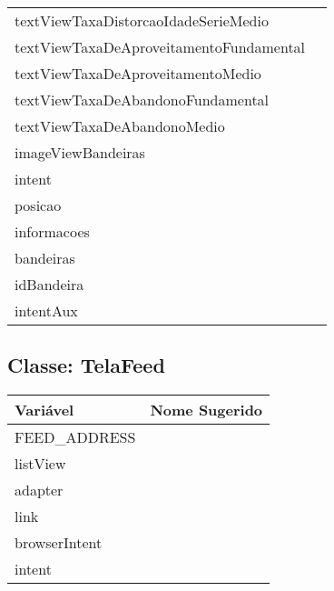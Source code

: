 \documentclass[12pt]{article}
\begin{document}
\begin{table}[H]
\begin{center}
\begin{tabular}{l | l}
						textViewTaxaDistorcaoIdadeSerieMedio & \\
						textViewTaxaDeAproveitamentoFundamental & \\
						textViewTaxaDeAproveitamentoMedio & \\
						textViewTaxaDeAbandonoFundamental & \\
						textViewTaxaDeAbandonoMedio & \\
						imageViewBandeiras & \\
						intent & \\
						posicao & \\
						informacoes & \\
						bandeiras & \\
						idBandeira & \\
						intentAux & \\
					\bottomrule
				\end{tabular}
			\end{center}
		\end{table}

	\subsection{Classe: TelaFeed}
		\begin{table}[H]
			\begin{center}
				\begin{tabular}{l | l}
					\toprule
						Variável & Nome Sugerido\\
					\midrule
						FEED\_ADDRESS & \\
						listView & \\
						adapter & \\
						link & \\
						browserIntent & \\
						intent & \\
					\bottomrule
				\end{tabular}
			\end{center}
		\end{table}
\end{document}

